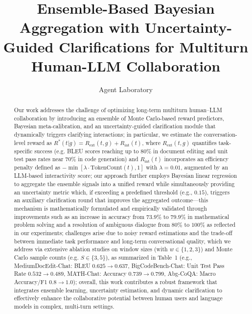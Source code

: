 \documentclass{article} %
\title{Ensemble-Based Bayesian Aggregation with Uncertainty-Guided Clarifications for Multiturn Human-LLM Collaboration}
\author{Agent Laboratory}
\date{}
\begin{document}
\maketitle

\begin{abstract}
Our work addresses the challenge of optimizing long-term multiturn human–LLM collaboration by introducing an ensemble of Monte Carlo-based reward predictors, Bayesian meta-calibration, and an uncertainty-guided clarification module that dynamically triggers clarifying interactions; in particular, we estimate the conversation-level reward as \(R^*(t|g) = R_{\text{ext}}(t,g) + R_{\text{int}}(t)\), where \(R_{\text{ext}}(t,g)\) quantifies task-specific success (e.g. BLEU scores reaching up to \(80\%\) in document editing and unit test pass rates near \(70\%\) in code generation) and \(R_{\text{int}}(t)\) incorporates an efficiency penalty defined as \(-\min[\lambda \cdot \text{TokenCount}(t), 1]\) with \(\lambda=0.01\), augmented by an LLM-based interactivity score; our approach further employs Bayesian linear regression to aggregate the ensemble signals into a unified reward while simultaneously providing an uncertainty metric which, if exceeding a predefined threshold (e.g., \(0.15\)), triggers an auxiliary clarification round that improves the aggregated outcome—this mechanism is mathematically formulated and empirically validated through improvements such as an increase in accuracy from \(73.9\%\) to \(79.9\%\) in mathematical problem solving and a resolution of ambiguous dialogue from \(80\%\) to \(100\%\) as reflected in our experiments; challenges arise due to noisy reward estimations and the trade-off between immediate task performance and long-term conversational quality, which we address via extensive ablation studies on window sizes (with \(w \in \{1,2,3\}\)) and Monte Carlo sample counts (e.g. \(S \in \{3,5\}\)), as summarized in Table~1 (e.g., MediumDocEdit-Chat: BLEU \(0.625 \rightarrow 0.637\), BigCodeBench-Chat: Unit Test Pass Rate \(0.532 \rightarrow 0.489\), MATH-Chat: Accuracy \(0.739 \rightarrow 0.799\), Abg-CoQA: Macro Accuracy/F1 \(0.8 \rightarrow 1.0\)); overall, this work contributes a robust framework that integrates ensemble learning, uncertainty estimation, and dynamic clarification to effectively enhance the collaborative potential between human users and language models in complex, multi-turn settings.
\end{abstract}
\end{document}
